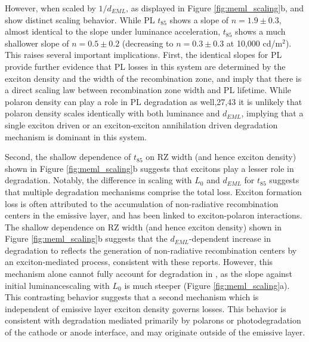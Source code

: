 \documentclass[../thesis.tex]{subfiles}
\begin{document}
However, when scaled by $1/d_{EML}$, as displayed in Figure \ref{fig:meml_scaling}b, \ef and \pl show distinct scaling behavior. 
While PL $t_{85}$ shows a slope of $n = 1.9\pm0.3$, almost identical to the slope under luminance acceleration, \ef $t_{85}$ shows a much shallower slope of $n = 0.5\pm0.2$ (decreasing to $n = 0.3\pm0.3$ at 10,000 cd/m$^2$). 
This raises several important implications.
First, the identical slopes for PL provide further evidence that PL losses in this system are determined by the exciton density and the width of the recombination zone, and imply that there is a direct scaling law between recombination zone width and PL lifetime. 
While polaron density can play a role in PL degradation as well,27,43 it is unlikely that polaron density scales identically with both luminance and $d_{EML}$, implying that a single exciton driven or an exciton-exciton annihilation driven degradation mechanism is dominant in this system.

Second, the shallow dependence of \ef $t_{85}$ on RZ width (and hence exciton density) shown in Figure \ref{fig:meml_scaling}b suggests that excitons play a lesser role in \ef degradation. 
Notably, the difference in scaling with $L_0$ and $d_{EML}$ for \ef $t_{85}$ suggests that multiple degradation mechanisms comprise the total \ef loss.  
Exciton formation loss is often attributed to the accumulation of non-radiative recombination centers in the emissive layer,\supercite{Kondakov2003,Kondakov2007d} and has been linked to exciton-polaron interactions.\supercite{Zhang2017a}
The shallow dependence on RZ width (and hence exciton density) shown in Figure \ref{fig:meml_scaling}b suggests that the $d_{EML}$-dependent increase in \ef degradation to reflects the generation of non-radiative recombination centers by an exciton-mediated process, consistent with these reports. 
However, this mechanism alone cannot fully account for degradation in \ef, as the slope against initial luminancescaling with $L_0$ is much steeper (Figure \ref{fig:meml_scaling}a). 
This contrasting behavior suggests that a second mechanism which is independent of emissive layer exciton density governs \ef losses. 
This behavior is consistent with degradation mediated primarily by polarons or photodegradation of the cathode or anode interface, and may originate outside of the emissive layer. \supercite{Wang2012,Wang2010a}
\end{document}
